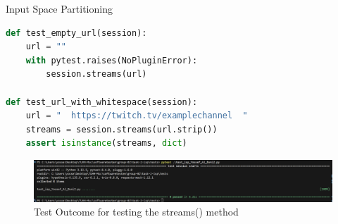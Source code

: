 \documentclass[a4paper]{scrreprt}
\newcounter{question}
\begin{document}
\begin{question}{Input Space Partitioning}
\begin{enumerate}[topsep=0pt, leftmargin=*]
\begin{answer}
\begin{lstlisting}[language=Python, caption={Hypothesis strategies for generating test input combinations}]
def test_empty_url(session):
    url = ""
    with pytest.raises(NoPluginError):
        session.streams(url)

def test_url_with_whitespace(session):
    url = "  https://twitch.tv/examplechannel  "
    streams = session.streams(url.strip())
    assert isinstance(streams, dict)
            \end{lstlisting}

    \begin{figure}[H]
    \centering
    \includegraphics[width=1.2\textwidth]{test_outcome_Yossef_Al_Buni.png} 
    \caption{Test Outcome for testing the streams() method}
    \label{fig:outcome_yossef}
    \end{figure}


          \end{answer}
  \end{enumerate}
\end{question}
\end{document}
